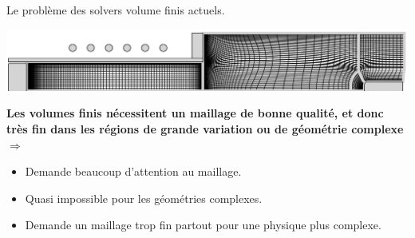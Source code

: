 \documentclass[24pt,t,table, aspectratio=169]{beamer}
\begin{document}
\begin{frame}{Le problème des solvers volume finis actuels.}

\begin{center}
\includegraphics[width=.65\linewidth]{./thierry_mesh.png}
\end{center}


{
\begin{framed}
\textbf{Les volumes finis nécessitent un maillage de bonne qualité, et donc très fin dans les régions de grande variation ou de géométrie complexe $\Rightarrow$}
\end{framed}

\begin{itemize}
\item Demande beaucoup d'attention au maillage.
\item Quasi impossible pour les géométries complexes.
\item Demande un maillage trop fin partout pour une physique plus complexe.
\end{itemize}

}

\end{frame}
\end{document}
